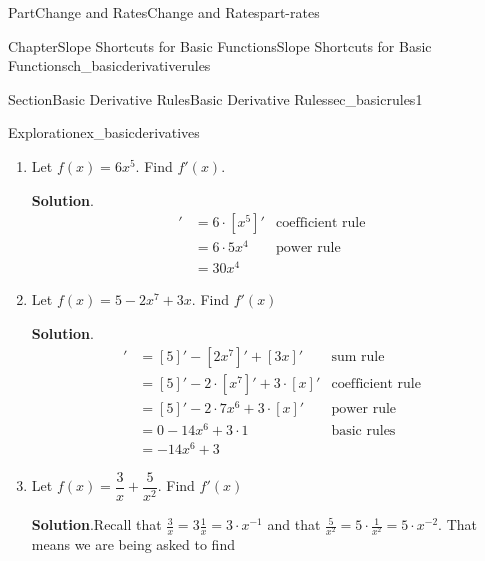\documentclass{tufte-book}
\newcommand{\blocktitlefont}{\relax}
\numberwithin{equation}{chapter}
\newcommand{\red}[1]{   {\color{red}   #1}   }
\newcommand{\blue}[1]{  {\color{blue}  #1}  }
\newcommand{\amp}{&}
\begin{document}
\begin{partptx}{Part}{Change and Rates}{}{Change and Rates}{}{}{part-rates}
\begin{chapterptx}{Chapter}{Slope Shortcuts for Basic Functions}{}{Slope Shortcuts for Basic Functions}{}{}{ch_basicderivativerules}
\begin{sectionptx}{Section}{Basic Derivative Rules}{}{Basic Derivative Rules}{}{}{sec_basicrules1}
\begin{exploration}{Exploration}{}{ex_basicderivatives}
\begin{enumerate}[font=\bfseries,label=(\alph*),ref=\alph*]
\begin{equation*}
[mx + b]' = 17
\end{equation*}
%
\par
You can also find this derivative using the formula for derivatives of sums and differences, for constant coefficients \([m\cdot f(x)]' = m\cdot [f(x)]'\) and the formulas  \([x]' = 1\) and \([m]' = 0\) for any number \(m\).%
\begin{align*}
[ \red{ 17x}  - {\blue 3}] \amp = [17x]' - [3]' \amp \text{sum rule}\\
\amp = 17[x]' - [3]' \amp \text{coefficient rule}\\
\amp = 17\cdot 1 - 0\amp\text{basic rules}\\
\amp = 17
\end{align*}
%
\item{}Let \(f(x) = 6x^5\).  Find \(f'(x)\).%
\par\smallskip%
\noindent\textbf{\blocktitlefont Solution}.\hypertarget{ex_basicderivatives-2-2}{}\quad{}%
\begin{align*}
[6x^5]' \amp = 6\cdot [x^5]' \amp \text{coefficient rule}\\
\amp = 6\cdot 5x^4 \amp\text{power rule}\\
\amp = 30 x^4
\end{align*}
%
\item{}Let \(f(x) = 5 - 2 x^7 + 3x\).  Find \(f'(x)\)%
\par\smallskip%
\noindent\textbf{\blocktitlefont Solution}.\hypertarget{ex_basicderivatives-3-2}{}\quad{}%
\begin{align*}
[5 - 2x^5 + 3x]' \amp = [5]' - [2x^7]' + [3x]' \amp \text{sum rule}\\
\amp = [5]' - 2\cdot [x^7]' + 3\cdot[x]' \amp \text{coefficient rule}\\
\amp = [5]' - 2\cdot 7 x^6 + 3\cdot[x]' \amp\text{power rule}\\
\amp = 0 - 14 x^6 + 3\cdot 1 \amp\text{basic rules}\\
\amp = -14x^6 + 3
\end{align*}
%
\item{}Let \(f(x) = \dfrac{3}{x} + \dfrac{5}{x^2}\). Find \(f'(x)\)%
\par\smallskip%
\noindent\textbf{\blocktitlefont Solution}.\hypertarget{ex_basicderivatives-4-2}{}\quad{}Recall that \(\frac{3}{x} = 3\frac{1}{x} = 3\cdot x^{-1}\) and that \(\frac{5}{x^2} = 5\cdot\frac{1}{x^2} = 5\cdot x^{-2}\). That means we are being asked to find%
\begin{align*}

\end{align*}
\end{enumerate}
\end{exploration}
\end{sectionptx}
\end{chapterptx}
\end{partptx}
\end{document}
